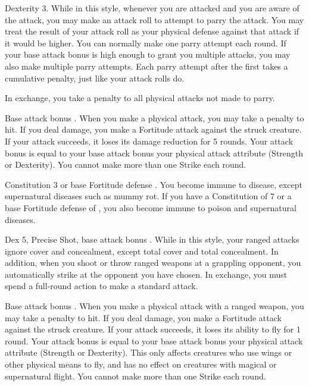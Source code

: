 \featpre Dexterity 3.
\featben While in this style, whenever you are attacked and you are aware of the attack, you may make an attack roll to attempt to parry the attack. You may treat the result of your attack roll as your physical defense against that attack if it would be higher. You can normally make one parry attempt each round. If your base attack bonus is high enough to grant you multiple attacks, you may also make multiple parry attempts. Each parry attempt after the first takes a cumulative  penalty, just like your attack rolls do.

In exchange, you take a  penalty to all physical attacks not made to parry.

\featpre Base attack bonus .
\featben When you make a physical attack, you may take a  penalty to hit. If you deal damage, you make a Fortitude attack against the struck creature. If your attack succeeds, it loses its damage reduction for 5 rounds. Your attack bonus is equal to your base attack bonus \add your physical attack attribute (Strength or Dexterity). You cannot make more than one Strike each round.

\featpre Constitution 3 or base Fortitude defense .
\featben You become immune to disease, except supernatural diseases such as mummy rot. If you have a Constitution of 7 or a base Fortitude defense of , you also become immune to poison and supernatural diseases.

 Dex 5, Precise Shot, base attack bonus .
 While in this style, your ranged attacks ignore cover and concealment, except total cover and total concealment. In addition, when you shoot or throw ranged weapons at a grappling opponent, you automatically strike at the opponent you have chosen. In exchange, you must spend a full-round action to make a standard attack.

\featpre Base attack bonus .
\featben When you make a physical attack with a ranged weapon, you may take a  penalty to hit. If you deal damage, you make a Fortitude attack against the struck creature. If your attack succeeds, it loses its ability to fly for 1 round. Your attack bonus is equal to your base attack bonus \add your physical attack attribute (Strength or Dexterity). This only affects creatures who use wings or other physical means to fly, and has no effect on creatures with magical or supernatural flight. You cannot make more than one Strike each round.

